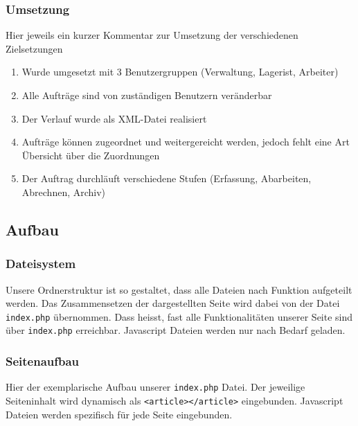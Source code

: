 \documentclass[ngerman, 12pt, pdftex]{scrartcl}[2006/07/30]
\begin{document}
	\subsubsection{Umsetzung}
		Hier jeweils ein kurzer Kommentar zur Umsetzung der verschiedenen Zielsetzungen
		\begin{enumerate}
				\item Wurde umgesetzt mit 3 Benutzergruppen (Verwaltung, Lagerist, Arbeiter)
				\item Alle Aufträge sind von zuständigen Benutzern veränderbar
				\item Der Verlauf wurde als XML-Datei realisiert
				\item Aufträge können zugeordnet und weitergereicht werden, jedoch fehlt eine Art Übersicht über die Zuordnungen
				\item Der Auftrag durchläuft verschiedene Stufen (Erfassung, Abarbeiten, Abrechnen, Archiv)
		\end{enumerate}

\subsection{Aufbau}
	\subsubsection{Dateisystem}
Unsere Ordnerstruktur ist so gestaltet, dass alle Dateien nach Funktion aufgeteilt werden.
Das Zusammensetzen der dargestellten Seite wird dabei von der Datei \verb+index.php+ übernommen. 
Dass heisst, fast alle Funktionalitäten unserer Seite sind über \verb+index.php+ erreichbar.
Javascript Dateien werden nur nach Bedarf geladen.
		
	\subsubsection{Seitenaufbau}
	Hier der exemplarische Aufbau unserer \verb+index.php+ Datei. 
	Der jeweilige Seiteninhalt wird dynamisch als \verb+<article></article>+ eingebunden.
	Javascript Dateien werden spezifisch für jede Seite eingebunden.
	
\end{document}
